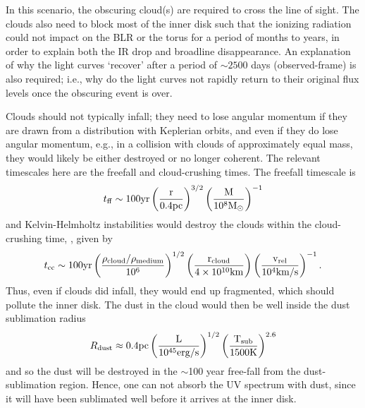 \documentclass[a4paper,fleqn,usenatbib]{mnras}
\begin{document}
In this scenario, the obscuring cloud(s) are required to cross the line
of sight. The clouds also need to block most of the inner disk such
that the ionizing radiation could not impact on the BLR or the torus
for a period of months to years, in order to explain both the IR drop and
broadline disappearance. An explanation of why the light curves
`recover' after a period of $\sim 2500$ days (observed-frame) is also
required; i.e., why do the light curves not rapidly return to their
original flux levels once the obscuring event is over.

Clouds should not typically infall; they need to lose angular momentum
if they are drawn from a distribution with Keplerian orbits, and even
if they do lose angular momentum, e.g., in a collision with clouds of 
approximately equal mass, they would likely be either destroyed or no
longer coherent. The relevant timescales here are the freefall and
cloud-crushing times. The freefall timescale is 
\begin{equation}
    t_{{\rm ff}}   \sim 100   \rm{yr}  \left(\frac{r}{0.4\rm{pc}}\right)^{3/2} 
                                            \left(\frac{M}{10^{8}M_{\odot}}\right)^{-1}
\end{equation}
and Kelvin-Helmholtz instabilities would destroy the clouds within the
cloud-crushing time, \citep[e.g., ][]{Nagakura2008, Hopkins2013,
Shiokawa2015, Bae2016}, given by
\begin{equation}
    t_{\rm cc} \sim 100\rm{yr} \left(\frac{\rho_{cloud}/\rho_{medium}}{10^{6}}\right)^{1/2} 
                                            \left(\frac{r_{\rm cloud}}{4 \times 10^{10}\rm{km}}\right) 
                                            \left(\frac{v_{\rm rel}}{10^{4}\rm{km/s}}\right)^{-1}.
\label{eqn:T_cloudcrushing}
\end{equation}
Thus, even if clouds did infall, they would end up fragmented, which
should pollute the inner disk.  The dust in the cloud would then be
well inside the dust sublimation radius 
\begin{equation}
    R_{\rm dust} \approx 0.4\rm{pc}\left(\frac{L}{10^{45}\rm{erg/s}}\right)^{1/2}
                                                   \left(\frac{T_{\rm sub}}{1500\rm{K}}\right)^{2.6}
\end{equation}
and so the dust will be destroyed in the $\sim$100 year free-fall from
the dust-sublimation region. Hence, one can not absorb the UV spectrum
with dust, since it will have been sublimated well before it arrives
at the inner disk.
\end{document}
